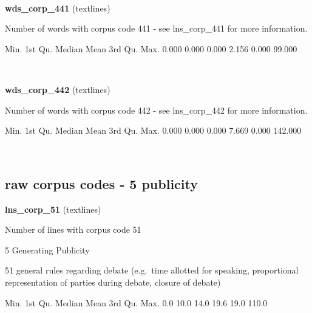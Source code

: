 \documentclass[]{article}
\newenvironment{Shaded}{\begin{snugshade}}{\end{snugshade}}
\newcommand{\FloatTok}[1]{\textcolor[rgb]{0.00,0.00,0.81}{{#1}}}
\newcommand{\NormalTok}[1]{{#1}}
\begin{document}
~

\vspace{1em}

\textbf{wds\_corp\_441} (textlines)

Number of words with corpus code 441 - see lns\_corp\_441 for more
information.

\begin{Shaded}
\begin{Highlighting}[]
   \NormalTok{Min. 1st Qu.  Median    Mean 3rd Qu.    Max. }
  \FloatTok{0.000}   \FloatTok{0.000}   \FloatTok{0.000}   \FloatTok{2.156}   \FloatTok{0.000}  \FloatTok{99.000} 
\end{Highlighting}
\end{Shaded}

~

\vspace{1em}

\textbf{wds\_corp\_442} (textlines)

Number of words with corpus code 442 - see lns\_corp\_442 for more
information.

\begin{Shaded}
\begin{Highlighting}[]
   \NormalTok{Min. 1st Qu.  Median    Mean 3rd Qu.    Max. }
  \FloatTok{0.000}   \FloatTok{0.000}   \FloatTok{0.000}   \FloatTok{7.669}   \FloatTok{0.000} \FloatTok{142.000} 
\end{Highlighting}
\end{Shaded}

~

\vspace{1em}

\subsection{raw corpus codes - 5
publicity}\label{raw-corpus-codes---5-publicity}

\textbf{lns\_corp\_51} (textlines)

Number of lines with corpus code 51

5 Generating Publicity

51 general rules regarding debate (e.g.~time allotted for speaking,
proportional representation of parties during debate, closure of debate)

\begin{Shaded}
\begin{Highlighting}[]
   \NormalTok{Min. 1st Qu.  Median    Mean 3rd Qu.    Max. }
    \FloatTok{0.0}    \FloatTok{10.0}    \FloatTok{14.0}    \FloatTok{19.6}    \FloatTok{19.0}   \FloatTok{110.0} 
\end{Highlighting}
\end{Shaded}
\end{document}
